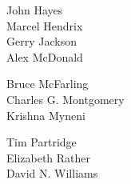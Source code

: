 \begin{minipage}[t]{.3\linewidth}
John		Hayes \\
Marcel		Hendrix \\
Gerry		Jackson \\
Alex		McDonald \\
\end{minipage}
\hfill
\begin{minipage}[t]{.3\linewidth}
Bruce		McFarling \\
Charles G.	Montgomery \\
Krishna		Myneni \\
\end{minipage}
\hfill
\begin{minipage}[t]{.3\linewidth}
Tim		Partridge \\
Elizabeth	Rather \\
David N.	Williams \\
\end{minipage}